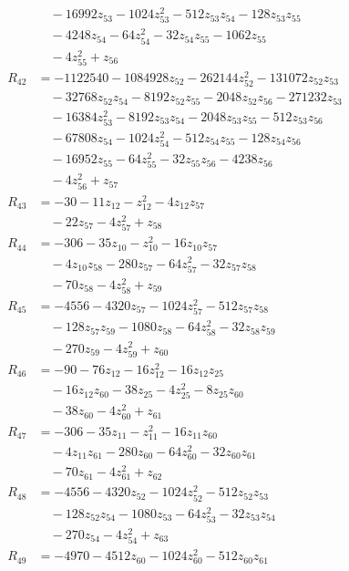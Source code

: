 \begin{align*}
&\quad -16992z_{53} -1024z_{53}^{2} -512z_{53}z_{54} -128z_{53}z_{55} \\
&\quad -4248z_{54} -64z_{54}^{2} -32z_{54}z_{55} -1062z_{55} \\
&\quad -4z_{55}^{2} +z_{56} \\
R_{42} &= -1122540 -1084928z_{52} -262144z_{52}^{2} -131072z_{52}z_{53} \\
&\quad -32768z_{52}z_{54} -8192z_{52}z_{55} -2048z_{52}z_{56} -271232z_{53} \\
&\quad -16384z_{53}^{2} -8192z_{53}z_{54} -2048z_{53}z_{55} -512z_{53}z_{56} \\
&\quad -67808z_{54} -1024z_{54}^{2} -512z_{54}z_{55} -128z_{54}z_{56} \\
&\quad -16952z_{55} -64z_{55}^{2} -32z_{55}z_{56} -4238z_{56} \\
&\quad -4z_{56}^{2} +z_{57} \\
R_{43} &= -30 -11z_{12} -z_{12}^{2} -4z_{12}z_{57} \\
&\quad -22z_{57} -4z_{57}^{2} +z_{58} \\
R_{44} &= -306 -35z_{10} -z_{10}^{2} -16z_{10}z_{57} \\
&\quad -4z_{10}z_{58} -280z_{57} -64z_{57}^{2} -32z_{57}z_{58} \\
&\quad -70z_{58} -4z_{58}^{2} +z_{59} \\
R_{45} &= -4556 -4320z_{57} -1024z_{57}^{2} -512z_{57}z_{58} \\
&\quad -128z_{57}z_{59} -1080z_{58} -64z_{58}^{2} -32z_{58}z_{59} \\
&\quad -270z_{59} -4z_{59}^{2} +z_{60} \\
R_{46} &= -90 -76z_{12} -16z_{12}^{2} -16z_{12}z_{25} \\
&\quad -16z_{12}z_{60} -38z_{25} -4z_{25}^{2} -8z_{25}z_{60} \\
&\quad -38z_{60} -4z_{60}^{2} +z_{61} \\
R_{47} &= -306 -35z_{11} -z_{11}^{2} -16z_{11}z_{60} \\
&\quad -4z_{11}z_{61} -280z_{60} -64z_{60}^{2} -32z_{60}z_{61} \\
&\quad -70z_{61} -4z_{61}^{2} +z_{62} \\
R_{48} &= -4556 -4320z_{52} -1024z_{52}^{2} -512z_{52}z_{53} \\
&\quad -128z_{52}z_{54} -1080z_{53} -64z_{53}^{2} -32z_{53}z_{54} \\
&\quad -270z_{54} -4z_{54}^{2} +z_{63} \\
R_{49} &= -4970 -4512z_{60} -1024z_{60}^{2} -512z_{60}z_{61} \\

\end{align*}
